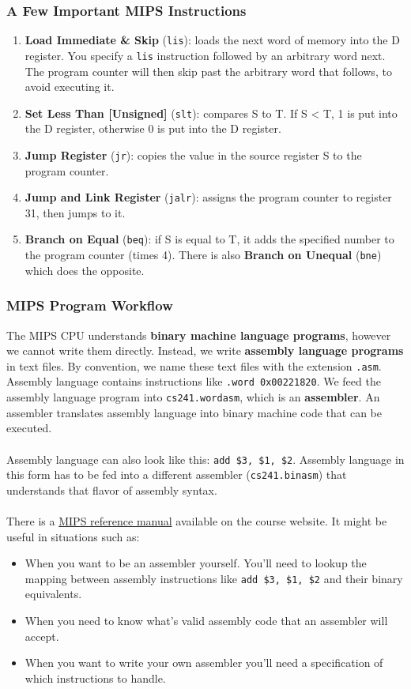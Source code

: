 \documentclass[]{article}
\theoremstyle{definition}
\newcommand{\lecture}[1]{\marginpar{{\footnotesize $\leftarrow$ \underline{#1}}}}
\begin{document}
		\subsubsection{A Few Important MIPS Instructions}
			\begin{enumerate}
				\item \textbf{Load Immediate \& Skip} (\verb+lis+): loads the next word of memory into the D register. You specify a \verb+lis+ instruction followed by an arbitrary word next. The program counter will then skip past the arbitrary word that follows, to avoid executing it.
				\item \textbf{Set Less Than [Unsigned]} (\verb+slt+): compares S to T. If S < T, 1 is put into the D register, otherwise 0 is put into the D register.
				\item \textbf{Jump Register} (\verb+jr+): copies the value in the source register S to the program counter.
				\item \textbf{Jump and Link Register} (\verb+jalr+): assigns the program counter to register 31, then jumps to it.
				\item \textbf{Branch on Equal} (\verb+beq+): if S is equal to T, it adds the specified number to the program counter (times 4). There is also \textbf{Branch on Unequal} (\verb+bne+) which does the opposite.
			\end{enumerate}
		\subsubsection{MIPS Program Workflow}
			\lecture{January 14, 2013}
			The MIPS CPU understands \textbf{binary machine language programs}, however we cannot write them directly. Instead, we write \textbf{assembly language programs} in text files. By convention, we name these text files with the extension \verb+.asm+. Assembly language contains instructions like \verb+.word 0x00221820+. We feed the assembly language program into \verb+cs241.wordasm+, which is an \textbf{assembler}. An assembler translates assembly language into binary machine code that can be executed.
			\\ \\
			Assembly language can also look like this: \verb+add $3, $1, $2+. Assembly language in this form has to be fed into a different assembler (\verb+cs241.binasm+) that understands that flavor of assembly syntax.
			\\ \\
			There is a \href{https://www.student.cs.uwaterloo.ca/~cs241/mips/mipsasm.html}{MIPS reference manual} available on the course website. It might be useful in situations such as:
			\begin{itemize}
				\item When you want to be an assembler yourself. You'll need to lookup the mapping between assembly instructions like \verb+add $3, $1, $2+ and their binary equivalents.
				\item When you need to know what's valid assembly code that an assembler will accept.
				\item When you want to write your own assembler you'll need a specification of which instructions to handle.
			\end{itemize}
\end{document}
